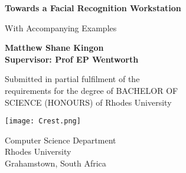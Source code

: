 \begin{titlepage}
    \begin{center}
        \vspace*{1cm}
        
		\Huge
        \textbf{Towards a Facial Recognition Workstation}
        
        \vspace{0.5cm}
		\LARGE
        With Accompanying Examples
        
        \vspace{1.5cm}
        
        \textbf{Matthew Shane Kingon} \\
        \textbf{Supervisor: Prof EP Wentworth}
		
        \vfill
        
		Submitted in partial fulfilment of the \\
		requirements for the degree of BACHELOR OF \\
		SCIENCE (HONOURS) of Rhodes University
        
        \vspace{0.8cm}
        
        \texttt{[image: Crest.png]}
        
		\Large
        Computer Science Department\\
        Rhodes University\\
        Grahamstown, South Africa\\
		\date{April 27, 2015 -- \today}
        
    \end{center}
\end{titlepage}